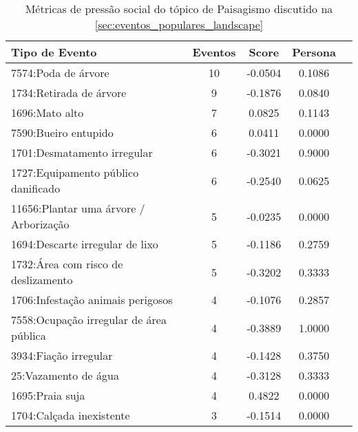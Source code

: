 \begin{table}[htbp]
	\centering
	\caption{Métricas de pressão social do tópico de Paisagismo discutido na \autoref{sec:eventos_populares_landscape}}
	\label{tab:eventos_populares_landscape}
	\begin{tabular}{|l|c|c|c|c|}
		\hline
		\textbf{Tipo de Evento}                 & \textbf{Eventos} & \textbf{Score} & \textbf{Persona} \\
		\hline
		7574:Poda de árvore                     & 10               & -0.0504        & 0.1086           \\
		\hline
		1734:Retirada de árvore                 & 9                & -0.1876        & 0.0840           \\
		\hline
		1696:Mato alto                          & 7                & 0.0825         & 0.1143           \\
		\hline
		7590:Bueiro entupido                    & 6                & 0.0411         & 0.0000           \\
		\hline
		1701:Desmatamento irregular             & 6                & -0.3021        & 0.9000           \\
		\hline
		1727:Equipamento público danificado     & 6                & -0.2540        & 0.0625           \\
		\hline
		11656:Plantar uma árvore / Arborização  & 5                & -0.0235        & 0.0000           \\
		\hline
		1694:Descarte irregular de lixo         & 5                & -0.1186        & 0.2759           \\
		\hline
		1732:Área com risco de deslizamento     & 5                & -0.3202        & 0.3333           \\
		\hline
		1706:Infestação animais perigosos       & 4                & -0.1076        & 0.2857           \\
		\hline
		7558:Ocupação irregular de área pública & 4                & -0.3889        & 1.0000           \\
		\hline
		3934:Fiação irregular                   & 4                & -0.1428        & 0.3750           \\
		\hline
		25:Vazamento de água                    & 4                & -0.3128        & 0.3333           \\
		\hline
		1695:Praia suja                         & 4                & 0.4822         & 0.0000           \\
		\hline
		1704:Calçada inexistente                & 3                & -0.1514        & 0.0000           \\

\end{tabular}
\end{table}
